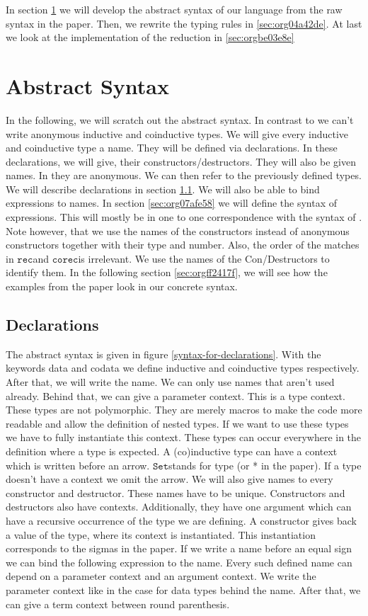 \documentclass[a4paper,cleardoubleempty,BCOR1cm]{scrbook}
\begin{document}
In section \ref{sec:org949bf11} we will develop the abstract syntax of our language
from the raw syntax in the paper. Then, we rewrite the typing rules in \ref{sec:org04a42de}. At last we look at the implementation of the reduction in \ref{sec:orgbe03e8e}
\section{Abstract Syntax}
\label{sec:org949bf11}
In the following, we will scratch out the abstract syntax. In contrast to
\cite{basold2016type} we can't write anonymous inductive and coinductive types.
We will give every inductive and coinductive type a name. They will be
defined via declarations. In these declarations, we will give, their
constructors/destructors. They will also be given names. In \cite{basold2016type}
they are anonymous. We can then refer to the previously defined types. We
will describe declarations in section \ref{sec:org4f8193a}. We will also be able to
bind expressions to names. In section \ref{sec:org07afe58} we will define the syntax
of expressions. This will mostly be in one to one correspondence with the
syntax of \cite{basold2016type}. Note however, that we use the names of the
constructors instead of anonymous constructors together with their type and
number. Also, the order of the matches in $\mathtt{rec}$\;and $\mathtt{corec}$\;is irrelevant. We use
the names of the Con/Destructors to identify them. In the following section
\ref{sec:orgff2417f}, we will see how the examples from the paper look in our concrete
syntax.
\subsection{Declarations}
\label{sec:org4f8193a}
The abstract syntax is given in figure \ref{syntax-for-declarations}. With the
keywords data and codata we define inductive and coinductive types
respectively. After that, we will write the name. We can only use names that
aren't used already. Behind that, we can give a parameter context. This is a
type context. These types are not polymorphic. They are merely macros to make
the code more readable and allow the definition of nested types. If we want
to use these types we have to fully instantiate this context. These types can
occur everywhere in the definition where a type is expected. A (co)inductive
type can have a context which is written before an arrow. $\mathtt{Set}$\;stands for
type (or * in the paper). If a type doesn't have a context we omit the arrow.
We will also give names to every constructor and destructor. These names have
to be unique. Constructors and destructors also have contexts. Additionally,
they have one argument which can have a recursive occurrence of the type we
are defining. A constructor gives back a value of the type, where its
context is instantiated. This instantiation corresponds to the sigmas in the
paper. If we write a name before an equal sign we can bind the following
expression to the name. Every such defined name can depend on a parameter
context and an argument context. We write the parameter context like in the
case for data types behind the name. After that, we can give a term context
between round parenthesis.
\end{document}
